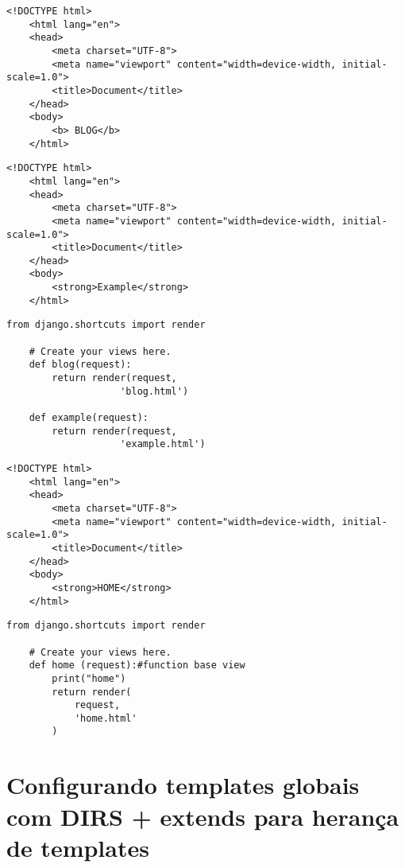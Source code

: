 \documentclass{article}
\begin{document}
\begin{lstlisting}[style=htmlStyle, caption={blog/templates/blog/blog.html}]
    <!DOCTYPE html>
    <html lang="en">
    <head>
        <meta charset="UTF-8">
        <meta name="viewport" content="width=device-width, initial-scale=1.0">
        <title>Document</title>
    </head>
    <body>
        <b> BLOG</b>
    </html>
\end{lstlisting}


\begin{lstlisting}[style= htmlStyle, caption={blog/templates/blog/example.html}]
    <!DOCTYPE html>
    <html lang="en">
    <head>
        <meta charset="UTF-8">
        <meta name="viewport" content="width=device-width, initial-scale=1.0">
        <title>Document</title>
    </head>
    <body>
        <strong>Example</strong>
    </html>

\end{lstlisting}

\begin{lstlisting}[style=pythonStyle, caption={blog/views.py}]
    from django.shortcuts import render

    # Create your views here.
    def blog(request):
        return render(request,
                    'blog.html')

    def example(request):
        return render(request, 
                    'example.html')

\end{lstlisting}


\begin{lstlisting}[style=htmlStyle, caption={home/templates/home/home.html}]
    <!DOCTYPE html>
    <html lang="en">
    <head>
        <meta charset="UTF-8">
        <meta name="viewport" content="width=device-width, initial-scale=1.0">
        <title>Document</title>
    </head>
    <body>
        <strong>HOME</strong>
    </html>
\end{lstlisting}


\begin{lstlisting}[style=pythonStyle, caption={home/views.py}]
    from django.shortcuts import render

    # Create your views here.
    def home (request):#function base view
        print("home")
        return render(
            request,
            'home.html'
        )

\end{lstlisting}

\section{Configurando templates globais com DIRS + extends para herança de templates}
\end{document}
